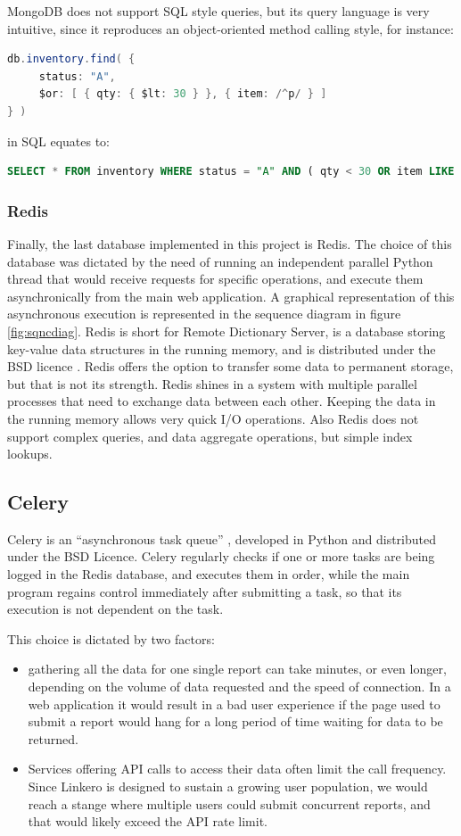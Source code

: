 MongoDB does not support SQL style queries, but its query language is very
intuitive, since it reproduces an object-oriented method calling style, for
instance:
\begin{lstlisting}[language=Java, breaklines=true]
db.inventory.find( {
     status: "A",
     $or: [ { qty: { $lt: 30 } }, { item: /^p/ } ]
} )
\end{lstlisting}
in SQL equates to:
\begin{lstlisting}[language=SQL, breaklines=true]
SELECT * FROM inventory WHERE status = "A" AND ( qty < 30 OR item LIKE "p%")
\end{lstlisting}

\subsubsection{Redis}
Finally, the last database implemented in this project is Redis\texttrademark.
The choice of this database was dictated by the need of running an independent
parallel Python thread that would receive requests for specific operations,
and execute them asynchronically from the main web application. A graphical
representation of this asynchronous execution is represented in the sequence
diagram in figure \ref{fig:sqncdiag}. Redis is short for Remote Dictionary
Server, is a database storing key-value data structures in the running
memory, and is distributed under the BSD licence \cite{Redis}. Redis offers the
option to transfer some data to permanent storage, but that is not its strength.
Redis shines in a system with multiple parallel processes that need to
exchange data between each other. Keeping the data in the running memory allows
very quick I/O operations. Also Redis does not support complex queries, and data
aggregate operations, but simple index lookups.

\subsection{Celery}
Celery is an ``asynchronous task queue'' \cite{Celery}, developed in Python and
distributed under the BSD Licence. Celery regularly checks if one or more tasks
are being logged in the Redis database, and executes them in order, while the
main program regains control immediately after submitting a task, so that its
execution is not dependent on the task.

This choice is dictated by two factors:
\begin{itemize}
  \item gathering all the data for one single report can take minutes, or even
  longer, depending on the volume of data requested and the speed of connection.
  In a web application it would result in a bad user experience if the page used
  to submit a report would hang for a long period of time waiting for data to be
  returned.
  \item Services offering API calls to access their data often limit the call
  frequency. Since Linkero is designed to sustain a growing user population,
  we would reach a stange where multiple users could submit concurrent reports,
  and that would likely exceed the API rate limit.
\end{itemize}

